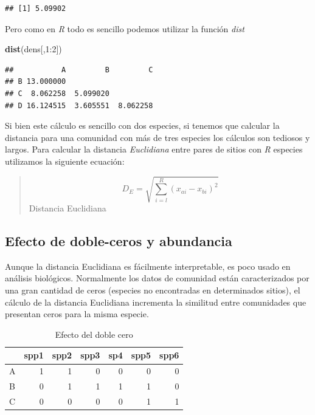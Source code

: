 \documentclass[]{book}
\newenvironment{Shaded}{\begin{snugshade}}{\end{snugshade}}
\newcommand{\KeywordTok}[1]{\textcolor[rgb]{0.13,0.29,0.53}{\textbf{{#1}}}}
\newcommand{\DecValTok}[1]{\textcolor[rgb]{0.00,0.00,0.81}{{#1}}}
\newcommand{\NormalTok}[1]{{#1}}
\begin{document}
\begin{verbatim}
## [1] 5.09902
\end{verbatim}

Pero como en \emph{R} todo es sencillo podemos utilizar la función
\emph{dist}

\begin{Shaded}
\begin{Highlighting}[]
\KeywordTok{dist}\NormalTok{(dens[,}\DecValTok{1}\NormalTok{:}\DecValTok{2}\NormalTok{])}
\end{Highlighting}
\end{Shaded}

\begin{verbatim}
##           A         B         C
## B 13.000000                    
## C  8.062258  5.099020          
## D 16.124515  3.605551  8.062258
\end{verbatim}

Si bien este cálculo es sencillo con dos especies, si tenemos que
calcular la distancia para una comunidad con más de tres especies los
cálculos son tediosos y largos. Para calcular la distancia
\emph{Euclidiana} entre pares de sitios con \emph{R} especies utilizamos
la siguiente ecuación:

\begin{quote}
\[D_E = \sqrt{\sum_{i=l}^R (x_{ai} - x_{bi})^2}\] Distancia Euclidiana
\end{quote}

\subsection{Efecto de doble-ceros y
abundancia}\label{efecto-de-doble-ceros-y-abundancia}

Aunque la distancia Euclidiana es fácilmente interpretable, es poco
usado en análisis biológicos. Normalmente los datos de comunidad están
caracterizados por una gran cantidad de ceros (especies no encontradas
en determinados sitios), el cálculo de la distancia Euclidiana
incrementa la similitud entre comunidades que presentan ceros para la
misma especie.

\begin{table}[t]

\caption{\label{tab:unnamed-chunk-9}Efecto del doble cero}
\centering
\begin{tabular}{l|r|r|r|r|r|r}
\hline
  & spp1 & spp2 & spp3 & sp4 & spp5 & spp6\\
\hline
A & 1 & 1 & 0 & 0 & 0 & 0\\
\hline
B & 0 & 1 & 1 & 1 & 1 & 0\\
\hline
C & 0 & 0 & 0 & 0 & 1 & 1\\
\hline
\end{tabular}
\end{table}
\end{document}
